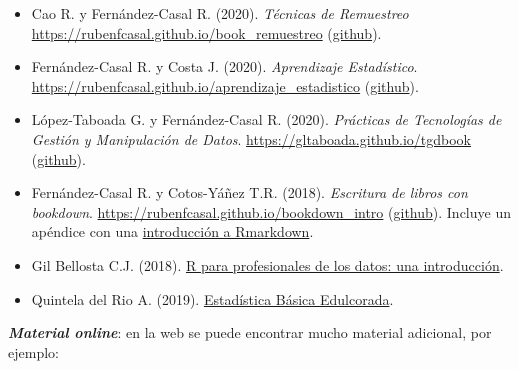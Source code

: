 \documentclass[
]{book}
\theoremstyle{break}
\theoremstyle{definition}
\theoremstyle{definition}
\theoremstyle{definition}
\theoremstyle{definition}
\theoremstyle{remark}
\begin{document}
\begin{itemize}
  \begin{itemize}
  \item
    Cao R. y Fernández-Casal R. (2020). \emph{Técnicas de Remuestreo} \url{https://rubenfcasal.github.io/book_remuestreo} (\href{https://github.com/rubenfcasal/book_remuestreo}{github}).
  \item
    Fernández-Casal R. y Costa J. (2020). \emph{Aprendizaje Estadístico}. \url{https://rubenfcasal.github.io/aprendizaje_estadistico} (\href{https://github.com/rubenfcasal/aprendizaje_estadistico}{github}).
  \item
    López-Taboada G. y Fernández-Casal R. (2020). \emph{Prácticas de Tecnologías de Gestión y Manipulación de Datos}. \url{https://gltaboada.github.io/tgdbook} (\href{https://github.com/gltaboada/tgdbook}{github}).
  \item
    Fernández-Casal R. y Cotos-Yáñez T.R. (2018). \emph{Escritura de libros con bookdown}. \url{https://rubenfcasal.github.io/bookdown_intro} (\href{https://github.com/rubenfcasal/bookdown_intro}{github}).
    Incluye un apéndice con una \href{https://rubenfcasal.github.io/bookdown_intro/rmarkdown.html}{introducción a Rmarkdown}.
  \item
    Gil Bellosta C.J. (2018). \href{https://www.datanalytics.com/libro_r/index.html}{R para profesionales de los datos: una introducción}.
  \item
    Quintela del Rio A. (2019). \href{https://bookdown.org/aquintela/EBE}{Estadística Básica Edulcorada}.
  \end{itemize}
\end{itemize}

\textbf{\emph{Material online}}:
en la web se puede encontrar mucho material adicional, por ejemplo:
\end{document}
